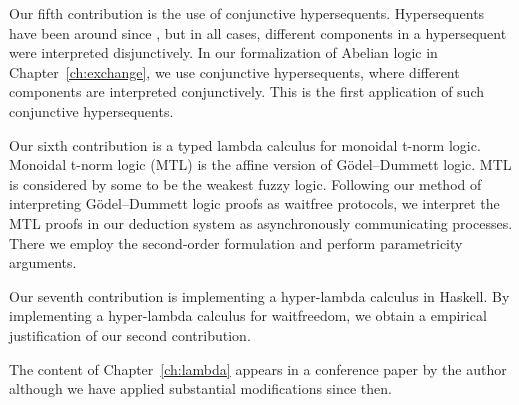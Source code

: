 Our fifth contribution is the use of conjunctive hypersequents.
Hypersequents have been around since \citet{avron91}, but
in all cases, different components in a hypersequent were interpreted
disjunctively.
In our formalization of Abelian logic in Chapter~\ref{ch:exchange},
we use conjunctive hypersequents, where different components are
interpreted conjunctively.
This is the first application of such conjunctive hypersequents.

Our sixth contribution is a typed lambda calculus for monoidal
t-norm logic.  Monoidal t-norm logic (MTL) is the affine version of
G\"odel--Dummett logic.
MTL is considered by some to be the weakest fuzzy logic.
Following our method of interpreting G\"odel--Dummett logic proofs as
waitfree protocols, we interpret the MTL proofs in our deduction system
as asynchronously communicating processes.
There we employ the second-order formulation and perform parametricity
arguments.

Our seventh contribution is implementing a hyper-lambda calculus in
Haskell.
By implementing a hyper-lambda calculus for waitfreedom,
we obtain a empirical justification of our second contribution.

The content of Chapter~\ref{ch:lambda} appears in
a conference paper by the author \citep{hiraiflops2012}
although we have applied substantial modifications since then.



